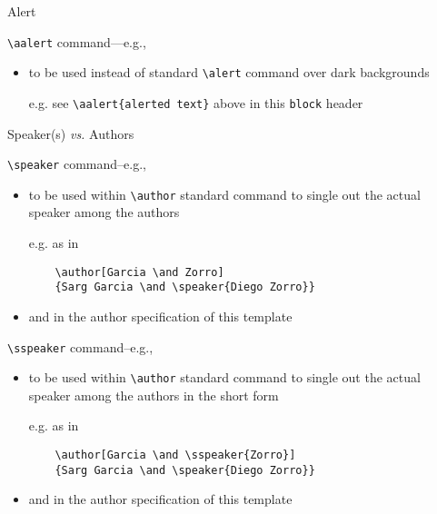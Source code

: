\documentclass[presentation]{beamer}\mode<presentation>{\usetheme{AMSBolognaFC}}
\begin{document}
\begin{frame}[c,fragile]{Alert}
%
\begin{block}{\texttt{\textbackslash{}aalert} command---e.g., }
\begin{itemize}
	\item to be used instead of standard \texttt{\textbackslash{}alert} command over dark backgrounds
	\item[e.g.] see \verb|\aalert{alerted text}| above in this \texttt{block} header
\end{itemize}
\end{block}
%
\end{frame}

\begin{frame}{Speaker(s) \emph{vs.} Authors}
%
\begin{exampleblock}{\texttt{\textbackslash{}speaker} command--e.g., }
\begin{itemize}
	\item to be used within \texttt{\textbackslash{}author} standard \BibTeX{} command to single out the actual speaker among the authors
	\item[e.g.] as in
\begin{verbatim}
	\author[Garcia \and Zorro]
	{Sarg Garcia \and \speaker{Diego Zorro}}
\end{verbatim}
	\item and in the author specification of this template
\end{itemize}
\end{exampleblock}
%
\begin{block}{\texttt{\textbackslash{}sspeaker} command--e.g., }
\begin{itemize}
	\item to be used within \texttt{\textbackslash{}author} standard \BibTeX{} command to single out the actual speaker among the authors in the short form
	\item[e.g.] as in
\begin{verbatim}
	\author[Garcia \and \sspeaker{Zorro}]
	{Sarg Garcia \and \speaker{Diego Zorro}}
\end{verbatim}
	\item and in the author specification of this template
\end{itemize}
\end{block}

\end{frame}
\end{document}
